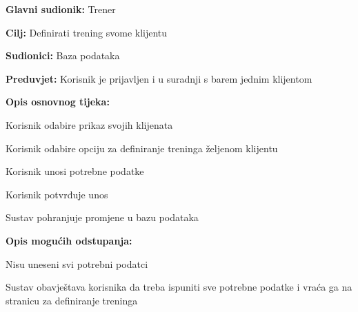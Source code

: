 					\noindent {}
					\begin{packed_item}
						
						\item \textbf{Glavni sudionik:} Trener
						\item  \textbf{Cilj:} Definirati trening svome klijentu
						\item  \textbf{Sudionici:} Baza podataka
						\item  \textbf{Preduvjet:} Korisnik je prijavljen i u suradnji s barem jednim klijentom
						\item  \textbf{Opis osnovnog tijeka:}
						
						\item[] \begin{packed_enum}
							
							\item Korisnik odabire prikaz svojih klijenata
							\item Korisnik odabire opciju za definiranje treninga željenom klijentu
							\item Korisnik unosi potrebne podatke
							\item Korisnik potvrđuje unos
							\item Sustav pohranjuje promjene u bazu podataka
							
						\end{packed_enum}
						
						\item  \textbf{Opis mogućih odstupanja:}
						
						\item[] \begin{packed_item}
							
							\item[4.a] Nisu uneseni svi potrebni podatci
							\item[] \begin{packed_enum}
								
								\item Sustav obavještava korisnika da treba ispuniti sve potrebne podatke i vraća ga na stranicu za definiranje treninga
								
							\end{packed_enum}
							
						\end{packed_item}
						
					\end{packed_item}
			
